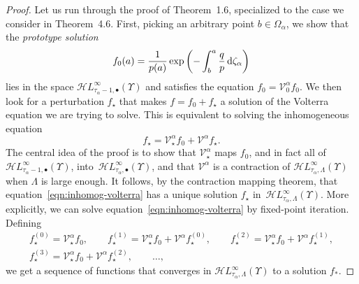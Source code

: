 \documentclass[10pt,a4paper]{amsart}
\newcommand{\singexp}[2]{\mathcal{H}L^\infty_{#1, #2}}
\newcommand{\singexpalg}[1]{\singexp{#1}{\bullet}}
\newcommand{\volterra}{\mathcal{V}}
\newcommand{\hardpart}{\mathcal{V}_0}
\newcommand{\softpart}{\mathcal{V}_\star}
\newcommand{\solwhole}{f}
\newcommand{\solproto}{f_0}
\newcommand{\solptb}{f_\star}
\numberwithin{equation}{section}
\begin{document}
\begin{proof}
Let us run through the proof of Theorem~1.6, specialized to the case we consider in Theorem~4.6. First, picking an arbitrary point $b \in \Omega_\alpha$, we show that the {\em prototype solution}
\[ \solproto(a) = \frac{1}{p(a)} \exp\left(-\int_{b}^{a}\frac{q}{p} \,{\rm d}\zeta_\alpha\right) \]
lies in the space $\singexpalg{\tau_\alpha - 1}(\Upsilon)$ and satisfies the equation $\solproto = \hardpart^\alpha \solproto$. We then look for a perturbation $\solptb$ that makes $\solwhole = \solproto + \solptb$ a solution of the Volterra equation we are trying to solve. This is equivalent to solving the inhomogeneous equation
\begin{equation}\label{eqn:inhomog-volterra}
\solptb = \softpart^\alpha \solproto + \volterra^\alpha \solptb.
\end{equation}
The central idea of the proof is to show that $\softpart^\alpha$ maps $\solproto$, and in fact all of $\singexpalg{\tau_\alpha - 1}(\Upsilon)$, into~$\singexpalg{\tau_\alpha}(\Upsilon)$, and that $\volterra^\alpha$ is a contraction of $\singexp{\tau_\alpha}{\Lambda}(\Upsilon)$ when $\Lambda$ is large enough. It follows, by the contraction mapping theorem, that equation~\eqref{eqn:inhomog-volterra} has a unique solution $\solptb$ in~$\singexp{\tau_\alpha}{\Lambda}(\Upsilon)$. More explicitly, we can solve equation~\eqref{eqn:inhomog-volterra} by fixed-point iteration. Defining
\begin{gather*}
\solptb^{(0)} = \softpart^\alpha \solproto ,\qquad
\solptb^{(1)} = \softpart^\alpha \solproto + \volterra^\alpha \solptb^{(0)} ,\qquad
\solptb^{(2)} = \softpart^\alpha \solproto + \volterra^\alpha \solptb^{(1)}, \\
\solptb^{(3)} = \softpart^\alpha \solproto + \volterra^\alpha \solptb^{(2)}, \qquad
\dots,
\end{gather*}
we get a sequence of functions that converges in $\singexp{\tau_\alpha}{\Lambda}(\Upsilon)$ to a solution $f_*$.


\end{proof}
\end{document}
